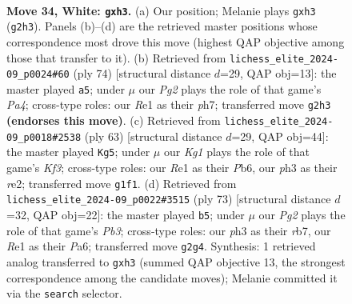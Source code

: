 \documentclass[11pt]{article}
\begin{document}
\clearpage

\begin{figure}[p]\centering
\begin{subfigure}{0.46\textwidth}\centering
\resizebox{\linewidth}{!}{%
\newchessgame
\chessboard[
  setfen={1r6/1p3p2/p3p1k1/8/P7/4PP1p/1R4PP/4R1K1 w - - 0 34},
  showmover=false,
  pgfstyle=straightmove, color=movearrow, markmove={g2-h3}
]}
\caption{}
\end{subfigure}\hfill
\begin{subfigure}{0.46\textwidth}\centering
\resizebox{\linewidth}{!}{%
\newchessgame
\chessboard[
  setfen={8/p2r3p/3p2p1/1P3p2/P2R3P/1k1K1P2/6P1/8 w - - 7 38},
  showmover=false,
  pgfstyle=straightmove, color=movearrow, markmove={a4-a5}
]}
\caption{}
\end{subfigure}
\\[4pt]
\begin{subfigure}{0.46\textwidth}\centering
\resizebox{\linewidth}{!}{%
\newchessgame
\chessboard[
  setfen={4r3/p1p5/1p3kp1/8/3Pp1P1/2P2P2/PP2R3/2K5 b - - 0 32},
  showmover=false,
  pgfstyle=straightmove, color=movearrow, markmove={f6-g5}
]}
\caption{}
\end{subfigure}\hfill
\begin{subfigure}{0.46\textwidth}\centering
\resizebox{\linewidth}{!}{%
\newchessgame
\chessboard[
  setfen={8/1R6/pp3r1p/2pr4/1k5P/1P4P1/P3RPK1/8 b - - 2 37},
  showmover=false,
  pgfstyle=straightmove, color=movearrow, markmove={b6-b5}
]}
\caption{}
\end{subfigure}
\caption{\textbf{Move 34, White: \texttt{gxh3}.} (a) Our position; Melanie plays \texttt{gxh3} (\texttt{g2h3}). Panels (b)--(d) are the retrieved master positions whose correspondence most drove this move (highest QAP objective among those that transfer to it). (b) Retrieved from \texttt{lichess\_elite\_2024-09\_p0024\#60} (ply 74) [structural distance $d$=29, QAP obj=13]: the master played \texttt{a5}; under $\mu$ our \emph{Pg2} plays the role of that game's \emph{Pa4}; cross-type roles: our \emph{R}e1 as their \emph{p}h7; transferred move \texttt{g2h3} \textbf{(endorses this move)}. (c) Retrieved from \texttt{lichess\_elite\_2024-09\_p0018\#2538} (ply 63) [structural distance $d$=29, QAP obj=44]: the master played \texttt{Kg5}; under $\mu$ our \emph{Kg1} plays the role of that game's \emph{Kf3}; cross-type roles: our \emph{R}e1 as their \emph{P}b6, our \emph{p}h3 as their \emph{r}e2; transferred move \texttt{g1f1}. (d) Retrieved from \texttt{lichess\_elite\_2024-09\_p0022\#3515} (ply 73) [structural distance $d$=32, QAP obj=22]: the master played \texttt{b5}; under $\mu$ our \emph{Pg2} plays the role of that game's \emph{Pb3}; cross-type roles: our \emph{p}h3 as their \emph{r}b7, our \emph{R}e1 as their \emph{P}a6; transferred move \texttt{g2g4}. Synthesis: 1 retrieved analog transferred to \texttt{gxh3} (summed QAP objective 13, the strongest correspondence among the candidate moves); Melanie committed it via the \texttt{search} selector.}
\label{fig:thought-m66}
\end{figure}
\end{document}
